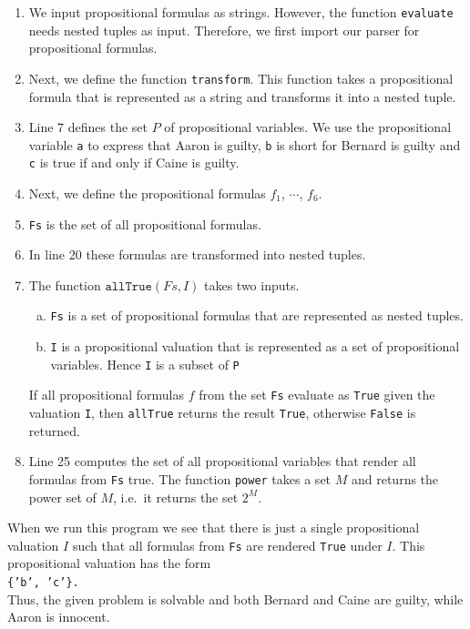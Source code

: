 \begin{enumerate}
\item We input propositional formulas as strings.  However, the function \texttt{evaluate} needs nested tuples
      as input.  Therefore, we first import our parser for propositional formulas.
\item Next, we define the function \texttt{transform}.  This function takes a propositional formula that is
      represented as a string and transforms it into a nested tuple.
\item Line 7 defines the set $P$ of propositional variables.  We use the propositional variable \texttt{a} to
      express that Aaron is guilty, \texttt{b} is short for Bernard is guilty and \texttt{c} is true if and
      only if Caine is guilty. 
\item Next, we define the propositional formulas $f_1$, $\cdots$, $f_6$.
\item \texttt{Fs} is the set of all propositional formulas.
\item In line 20 these formulas are transformed into nested tuples.
\item The function $\texttt{allTrue}(Fs, I)$ takes two inputs.
      \begin{enumerate}[(a)]
      \item \texttt{Fs} is a set of propositional formulas that are represented as nested tuples.
      \item \texttt{I} is a propositional valuation that is represented as a set of propositional variables.
            Hence \texttt{I} is a subset of \texttt{P}
      \end{enumerate}
      If all propositional formulas $f$ from the set \texttt{Fs} evaluate as \texttt{True} given the valuation
      \texttt{I}, then \texttt{allTrue} returns the result \texttt{True}, otherwise \texttt{False} is returned.
\item Line 25 computes the set of all propositional variables that render all formulas from \texttt{Fs} true.
      The function \texttt{power} takes a set $M$ and returns the power set of $M$, i.e.~it returns the set $2^M$.
\end{enumerate}
When we run this program we see that there is just a single propositional valuation $I$ such that all formulas
from \texttt{Fs} are rendered \texttt{True} under $I$.  This propositional valuation has the form
\\[0.2cm]
\hspace*{1.3cm}
\texttt{\{'b', 'c'\}.}
\\[0.2cm]
Thus, the given problem is solvable and both Bernard and Caine are guilty, while Aaron is innocent.
\pagebreak

